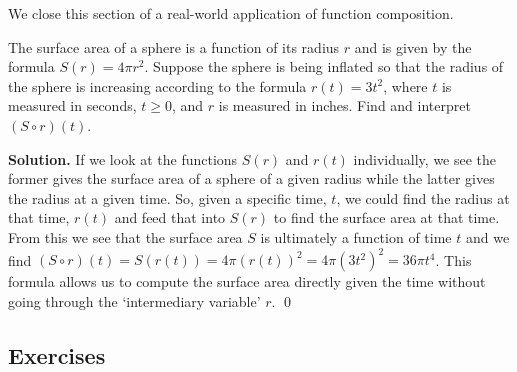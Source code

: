 We close this section of a real-world application of function composition.

\begin{ex}  The surface area of a sphere is a function of its radius $r$ and is given by the formula $S(r) = 4 \pi r^2$.  Suppose the sphere is being inflated so that the radius of the sphere is increasing according to the formula $r(t) = 3t^2$, where $t$ is measured in seconds, $t \geq 0$, and $r$ is measured in inches.  Find and interpret $(S \circ r)(t)$.

\smallskip

{\bf Solution.}  If we look at the functions $S(r)$ and $r(t)$ individually, we see the former gives the surface area of a sphere of a given radius while the latter gives the radius at a given time.    So, given a specific time, $t$, we could find the radius at that time, $r(t)$ and feed that into $S(r)$ to find the surface area at that time.  From this we see that the surface area $S$ is ultimately a function of time $t$ and we find $(S \circ r)(t) = S(r(t)) = 4 \pi (r(t))^2 = 4 \pi \left(3t^2\right)^2 = 36 \pi t^{4}$.  This formula allows us to compute the surface area directly given the time without going through the `intermediary variable' $r$. \qed

\end{ex}

\newpage

\subsection{Exercises}


\closegraphsfile